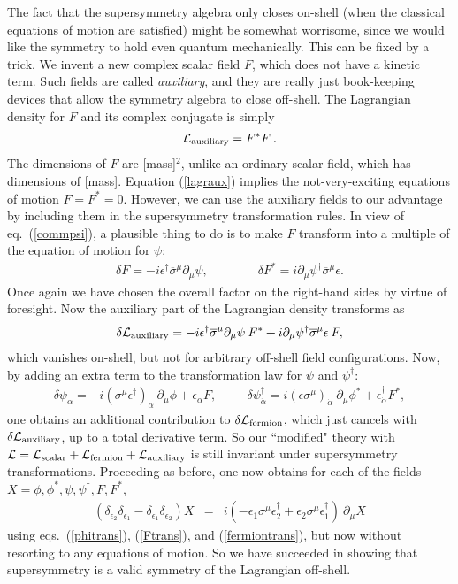 \documentclass[12pt]{article}
\def\beq{\begin{eqnarray}}
\def\eeq{\end{eqnarray}}
\def\lagr{{\cal L}}
\def\deltaeps{\delta}
\def\sigmabar{\overline\sigma}
\begin{document}
The fact that the supersymmetry algebra only closes on-shell (when the
classical equations of motion are satisfied) might be somewhat worrisome,
since we would like the symmetry to hold even quantum mechanically. This
can be fixed by a trick. We invent a new complex scalar field $F$, which
does not have a kinetic term. Such fields are called {\it auxiliary}, and
they are really just book-keeping devices that allow the symmetry algebra
to close off-shell. The Lagrangian density for $F$ and its complex
conjugate is simply
\beq
\lagr_{\rm auxiliary} = F^* F \> .
\label{lagraux}
\eeq
The dimensions of $F$ are [mass]$^2$, unlike an ordinary scalar field,
which has dimensions of [mass]. Equation (\ref{lagraux}) implies the
not-very-exciting equations of motion $F=F^*=0$. However, we can use the
auxiliary fields to our advantage by including them in the supersymmetry
transformation rules. In view of eq.~(\ref{commpsi}), a plausible thing to
do is to make $F$ transform into a multiple of the equation of motion for
$\psi$: 
\beq
\deltaeps F = - i \epsilon^\dagger \sigmabar^\mu \partial_\mu \psi,
\qquad\qquad
\deltaeps F^* = i\partial_\mu \psi^\dagger \sigmabar^\mu \epsilon .
\label{Ftrans}
\eeq
Once again we have chosen the overall factor on the right-hand sides by
virtue of foresight. Now the auxiliary part of the Lagrangian density
transforms as
\beq
\delta \lagr_{\rm auxiliary} = 
-i \epsilon^\dagger \sigmabar^\mu \partial_\mu \psi \> F^* 
+i \partial_\mu \psi^\dagger \sigmabar^\mu \epsilon \> F ,
\eeq
which vanishes on-shell, but not for arbitrary off-shell field
configurations. Now, by adding an extra term to
the transformation law for $\psi$ and $\psi^\dagger$:
\beq
\delta \psi_\alpha =
- i (\sigma^\mu \epsilon^\dagger)_{\alpha}\> \partial_\mu\phi 
+ \epsilon_\alpha F,
\qquad\>\>
\delta \psi_{\dot{\alpha}}^\dagger =
i (\epsilon\sigma^\mu)_{\dot{\alpha}}\> \partial_\mu \phi^* 
+ \epsilon^\dagger_{\dot{\alpha}} F^* ,
\label{fermiontrans}
\eeq
one obtains an additional contribution to $\deltaeps \lagr_{\rm fermion}$,
which just cancels with $\deltaeps \lagr_{\rm auxiliary}$, up to a total
derivative term. So our ``modified" theory with $\lagr = \lagr_{\rm
scalar} +\lagr_{\rm fermion} + \lagr_{\rm auxiliary}$ is still invariant
under supersymmetry transformations. Proceeding as before, one now obtains
for each of the fields $X=\phi,\phi^*,\psi,\psi^\dagger,F,F^*$,
\beq
(\delta_{\epsilon_2} \delta_{\epsilon_1} -
\delta_{\epsilon_1} \delta_{\epsilon_2}) X &=&
i (-\epsilon_1 \sigma^\mu \epsilon_2^\dagger +
   \epsilon_2 \sigma^\mu \epsilon_1^\dagger) \> \partial_\mu X
\label{anytrans}
\eeq
using eqs.~(\ref{phitrans}), (\ref{Ftrans}), and (\ref{fermiontrans}), but
now without resorting to any equations of motion. So we have
succeeded in showing that supersymmetry is a valid symmetry of the
Lagrangian off-shell.
\end{document}
